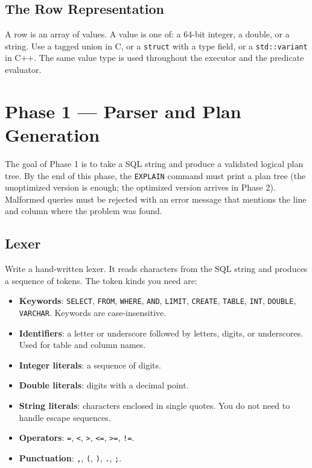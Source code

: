 \documentclass[11pt,a4paper]{article}
\begin{document}
\subsection{The Row Representation}
A row is an array of values. A value is one of: a 64-bit integer, a double, or a string. Use a tagged union in C, or a \texttt{struct} with a type field, or a \texttt{std::variant} in C++. The same value type is used throughout the executor and the predicate evaluator.

\section{Phase 1 --- Parser and Plan Generation}

The goal of Phase 1 is to take a SQL string and produce a validated logical plan tree. By the end of this phase, the \texttt{EXPLAIN} command must print a plan tree (the unoptimized version is enough; the optimized version arrives in Phase 2). Malformed queries must be rejected with an error message that mentions the line and column where the problem was found.

\subsection{Lexer}
Write a hand-written lexer. It reads characters from the SQL string and produces a sequence of tokens. The token kinds you need are:

\begin{itemize}
\item \textbf{Keywords}: \texttt{SELECT}, \texttt{FROM}, \texttt{WHERE}, \texttt{AND}, \texttt{LIMIT}, \texttt{CREATE}, \texttt{TABLE}, \texttt{INT}, \texttt{DOUBLE}, \texttt{VARCHAR}. Keywords are case-insensitive.
\item \textbf{Identifiers}: a letter or underscore followed by letters, digits, or underscores. Used for table and column names.
\item \textbf{Integer literals}: a sequence of digits.
\item \textbf{Double literals}: digits with a decimal point.
\item \textbf{String literals}: characters enclosed in single quotes. You do not need to handle escape sequences.
\item \textbf{Operators}: \texttt{=}, \texttt{<}, \texttt{>}, \texttt{<=}, \texttt{>=}, \texttt{!=}.
\item \textbf{Punctuation}: \texttt{,}, \texttt{(}, \texttt{)}, \texttt{.}, \texttt{;}.
\end{itemize}
\end{document}
